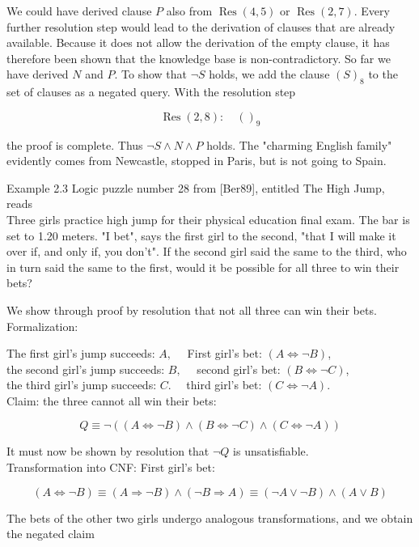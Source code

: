 \documentclass[10pt]{article}
\begin{document}
We could have derived clause $P$ also from $\operatorname{Res}(4,5)$ or $\operatorname{Res}(2,7)$. Every further resolution step would lead to the derivation of clauses that are already available. Because it does not allow the derivation of the empty clause, it has therefore been shown that the knowledge base is non-contradictory. So far we have derived $N$ and $P$. To show that $\neg S$ holds, we add the clause $(S)_{8}$ to the set of clauses as a negated query. With the resolution step

$$
\operatorname{Res}(2,8): \quad()_{9}
$$

the proof is complete. Thus $\neg S \wedge N \wedge P$ holds. The "charming English family" evidently comes from Newcastle, stopped in Paris, but is not going to Spain.

Example 2.3 Logic puzzle number 28 from [Ber89], entitled The High Jump, reads\\

Three girls practice high jump for their physical education final exam. The bar is set to 1.20 meters. "I bet", says the first girl to the second, "that I will make it over if, and only if, you don't". If the second girl said the same to the third, who in turn said the same to the first, would it be possible for all three to win their bets?

We show through proof by resolution that not all three can win their bets.\\
Formalization:

The first girl's jump succeeds: $A, \quad$ First girl's bet: $(A \Leftrightarrow \neg B)$,\\
the second girl's jump succeeds: $B, \quad$ second girl's bet: $(B \Leftrightarrow \neg C)$,\\
the third girl's jump succeeds: $C . \quad$ third girl's bet: $(C \Leftrightarrow \neg A)$.\\
Claim: the three cannot all win their bets:

$$
Q \equiv \neg((A \Leftrightarrow \neg B) \wedge(B \Leftrightarrow \neg C) \wedge(C \Leftrightarrow \neg A))
$$

It must now be shown by resolution that $\neg Q$ is unsatisfiable.\\
Transformation into CNF: First girl's bet:

$$
(A \Leftrightarrow \neg B) \equiv(A \Rightarrow \neg B) \wedge(\neg B \Rightarrow A) \equiv(\neg A \vee \neg B) \wedge(A \vee B)
$$

The bets of the other two girls undergo analogous transformations, and we obtain the negated claim
\end{document}
